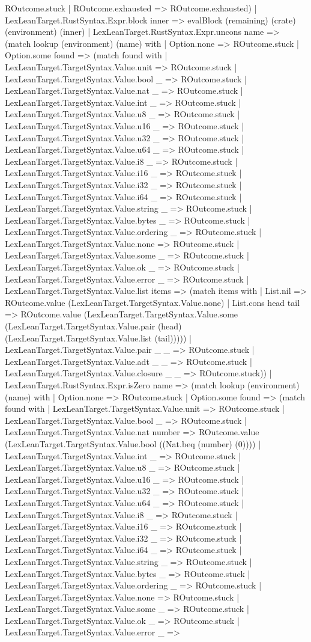 \documentclass[11pt]{article}
\begin{document}
ROutcome.stuck | ROutcome.exhausted => ROutcome.exhausted) | LexLeanTarget.RustSyntax.Expr.block inner => evalBlock (remaining) (crate) (environment) (inner) | LexLeanTarget.RustSyntax.Expr.uncons name => (match lookup (environment) (name) with | Option.none => ROutcome.stuck | Option.some found => (match found with | LexLeanTarget.TargetSyntax.Value.unit => ROutcome.stuck | LexLeanTarget.TargetSyntax.Value.bool \_ => ROutcome.stuck | LexLeanTarget.TargetSyntax.Value.nat \_ => ROutcome.stuck | LexLeanTarget.TargetSyntax.Value.int \_ => ROutcome.stuck | LexLeanTarget.TargetSyntax.Value.u8 \_ => ROutcome.stuck | LexLeanTarget.TargetSyntax.Value.u16 \_ => ROutcome.stuck | LexLeanTarget.TargetSyntax.Value.u32 \_ => ROutcome.stuck | LexLeanTarget.TargetSyntax.Value.u64 \_ => ROutcome.stuck | LexLeanTarget.TargetSyntax.Value.i8 \_ => ROutcome.stuck | LexLeanTarget.TargetSyntax.Value.i16 \_ => ROutcome.stuck | LexLeanTarget.TargetSyntax.Value.i32 \_ => ROutcome.stuck | LexLeanTarget.TargetSyntax.Value.i64 \_ => ROutcome.stuck | LexLeanTarget.TargetSyntax.Value.string \_ => ROutcome.stuck | LexLeanTarget.TargetSyntax.Value.bytes \_ => ROutcome.stuck | LexLeanTarget.TargetSyntax.Value.ordering \_ => ROutcome.stuck | LexLeanTarget.TargetSyntax.Value.none => ROutcome.stuck | LexLeanTarget.TargetSyntax.Value.some \_ => ROutcome.stuck | LexLeanTarget.TargetSyntax.Value.ok \_ => ROutcome.stuck | LexLeanTarget.TargetSyntax.Value.error \_ => ROutcome.stuck | LexLeanTarget.TargetSyntax.Value.list items => (match items with | List.nil => ROutcome.value (LexLeanTarget.TargetSyntax.Value.none) | List.cons head tail => ROutcome.value (LexLeanTarget.TargetSyntax.Value.some (LexLeanTarget.TargetSyntax.Value.pair (head) (LexLeanTarget.TargetSyntax.Value.list (tail))))) | LexLeanTarget.TargetSyntax.Value.pair \_ \_ => ROutcome.stuck | LexLeanTarget.TargetSyntax.Value.adt \_ \_ => ROutcome.stuck | LexLeanTarget.TargetSyntax.Value.closure \_ \_ => ROutcome.stuck)) | LexLeanTarget.RustSyntax.Expr.isZero name => (match lookup (environment) (name) with | Option.none => ROutcome.stuck | Option.some found => (match found with | LexLeanTarget.TargetSyntax.Value.unit => ROutcome.stuck | LexLeanTarget.TargetSyntax.Value.bool \_ => ROutcome.stuck | LexLeanTarget.TargetSyntax.Value.nat number => ROutcome.value (LexLeanTarget.TargetSyntax.Value.bool ((Nat.beq (number) (0)))) | LexLeanTarget.TargetSyntax.Value.int \_ => ROutcome.stuck | LexLeanTarget.TargetSyntax.Value.u8 \_ => ROutcome.stuck | LexLeanTarget.TargetSyntax.Value.u16 \_ => ROutcome.stuck | LexLeanTarget.TargetSyntax.Value.u32 \_ => ROutcome.stuck | LexLeanTarget.TargetSyntax.Value.u64 \_ => ROutcome.stuck | LexLeanTarget.TargetSyntax.Value.i8 \_ => ROutcome.stuck | LexLeanTarget.TargetSyntax.Value.i16 \_ => ROutcome.stuck | LexLeanTarget.TargetSyntax.Value.i32 \_ => ROutcome.stuck | LexLeanTarget.TargetSyntax.Value.i64 \_ => ROutcome.stuck | LexLeanTarget.TargetSyntax.Value.string \_ => ROutcome.stuck | LexLeanTarget.TargetSyntax.Value.bytes \_ => ROutcome.stuck | LexLeanTarget.TargetSyntax.Value.ordering \_ => ROutcome.stuck | LexLeanTarget.TargetSyntax.Value.none => ROutcome.stuck | LexLeanTarget.TargetSyntax.Value.some \_ => ROutcome.stuck | LexLeanTarget.TargetSyntax.Value.ok \_ => ROutcome.stuck | LexLeanTarget.TargetSyntax.Value.error \_ => 
\end{document}
